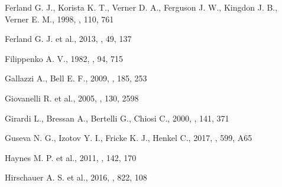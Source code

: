\begin{thebibliography}{}
 Ferland G. J., Korista K. T.,
Verner D. A., Ferguson J. W., Kingdon J. B., Verner E. M., 1998,
\pasp, 110, 761

 Ferland G. J. et al., 2013, \rmxaa, 
49, 137

 Filippenko A. V., 1982, \pasp, 
94, 715





 Gallazzi A., Bell E. F., 2009, \apjs,
185, 253 %


 Giovanelli R. et al., 2005, \aj, 130, 2598

 Girardi L., Bressan A., Bertelli G., 
Chiosi C., 2000, \aaps, 141, 371




 Guseva N. G., Izotov Y. I., Fricke K. J.,
Henkel C., 2017, \aap, 599, A65

 Haynes M. P. et al., 2011, \aj, 142, 170

 Hirschauer A. S. et al., 2016, \apj, 822,
108


\end{thebibliography}
